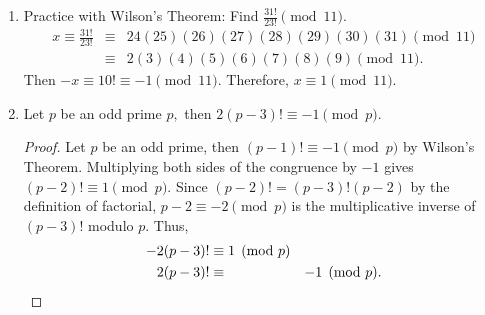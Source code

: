 \documentclass{../ximera}
\begin{document}
\begin{example}
\begin{enumerate}
 \item  Practice with Wilson's Theorem: 
 Find  $\frac{31!}{23!} \pmod{11}.$
 \begin{align*}
 x\equiv \frac{31!}{23!}	 & \equiv & 24(25)(26)(27)(28)(29)(30)(31) \pmod{11}\\
 			 & \equiv & 2(3)(4)(5)(6)(7)(8)(9) \pmod{11}.
\end{align*}
Then $-x\equiv 10! \equiv -1\pmod{11}.$ Therefore, $x\equiv 1\pmod{11}.$

\item Let $p$ be an odd prime $p,$ then $2(p-3)!\equiv -1 \pmod{p}$.
 
\begin{proof}
 Let $p$ be an odd prime, then $(p-1)!\equiv -1\pmod{p}$ by Wilson's Theorem. Multiplying both sides of the congruence by $-1$ gives $(p-2)!\equiv 1\pmod{p}.$ Since $(p-2)!=(p-3)!(p-2)$ by the definition of factorial, $p-2\equiv -2\pmod{p}$ is the multiplicative inverse of $(p-3)!$ modulo $p.$ Thus, 
\begin{align*}
 -2(p-3)!	&\equiv 1\pmod{p}\\
 2(p-3)!	 & \equiv & -1\pmod{p}.\qedhere
\end{align*}
\end{proof}
\end{enumerate}

\end{example}


\end{document}
